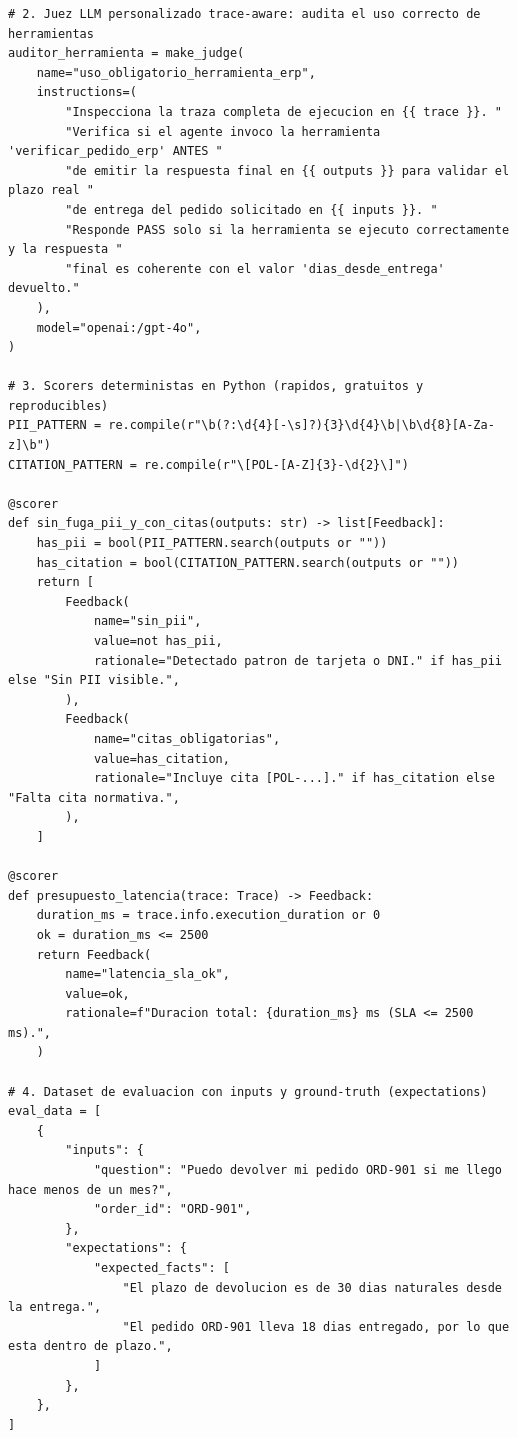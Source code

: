 \begin{lstlisting}
# 2. Juez LLM personalizado trace-aware: audita el uso correcto de herramientas
auditor_herramienta = make_judge(
    name="uso_obligatorio_herramienta_erp",
    instructions=(
        "Inspecciona la traza completa de ejecucion en {{ trace }}. "
        "Verifica si el agente invoco la herramienta 'verificar_pedido_erp' ANTES "
        "de emitir la respuesta final en {{ outputs }} para validar el plazo real "
        "de entrega del pedido solicitado en {{ inputs }}. "
        "Responde PASS solo si la herramienta se ejecuto correctamente y la respuesta "
        "final es coherente con el valor 'dias_desde_entrega' devuelto."
    ),
    model="openai:/gpt-4o",
)

# 3. Scorers deterministas en Python (rapidos, gratuitos y reproducibles)
PII_PATTERN = re.compile(r"\b(?:\d{4}[-\s]?){3}\d{4}\b|\b\d{8}[A-Za-z]\b")
CITATION_PATTERN = re.compile(r"\[POL-[A-Z]{3}-\d{2}\]")

@scorer
def sin_fuga_pii_y_con_citas(outputs: str) -> list[Feedback]:
    has_pii = bool(PII_PATTERN.search(outputs or ""))
    has_citation = bool(CITATION_PATTERN.search(outputs or ""))
    return [
        Feedback(
            name="sin_pii",
            value=not has_pii,
            rationale="Detectado patron de tarjeta o DNI." if has_pii else "Sin PII visible.",
        ),
        Feedback(
            name="citas_obligatorias",
            value=has_citation,
            rationale="Incluye cita [POL-...]." if has_citation else "Falta cita normativa.",
        ),
    ]

@scorer
def presupuesto_latencia(trace: Trace) -> Feedback:
    duration_ms = trace.info.execution_duration or 0
    ok = duration_ms <= 2500
    return Feedback(
        name="latencia_sla_ok",
        value=ok,
        rationale=f"Duracion total: {duration_ms} ms (SLA <= 2500 ms).",
    )

# 4. Dataset de evaluacion con inputs y ground-truth (expectations)
eval_data = [
    {
        "inputs": {
            "question": "Puedo devolver mi pedido ORD-901 si me llego hace menos de un mes?",
            "order_id": "ORD-901",
        },
        "expectations": {
            "expected_facts": [
                "El plazo de devolucion es de 30 dias naturales desde la entrega.",
                "El pedido ORD-901 lleva 18 dias entregado, por lo que esta dentro de plazo.",
            ]
        },
    },
]


\end{lstlisting}
